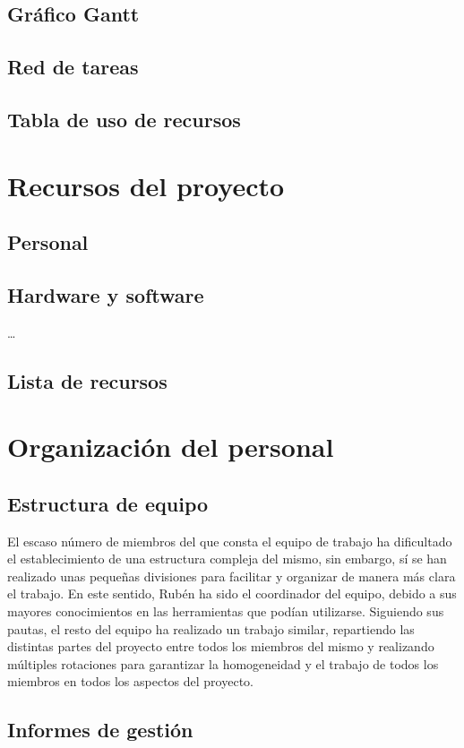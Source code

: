 \documentclass[11pt, a4paper, twoside]{report}
\begin{document}
		\subsection{Gráfico Gantt}
		\subsection{Red de tareas}
		\subsection{Tabla de uso de recursos}
	\section{Recursos del proyecto}
		\subsection{Personal}
		\subsection{Hardware y software}
			\ldots

		\subsection{Lista de recursos}
			

	\section{Organización del personal}
		\subsection{Estructura de equipo}	%
		El escaso número de miembros del que consta el equipo de trabajo ha dificultado el establecimiento de una estructura compleja del mismo, sin embargo, sí se han realizado unas pequeñas divisiones para facilitar y organizar de manera más clara el trabajo. En este sentido, Rubén ha sido el coordinador del equipo, debido a sus mayores conocimientos en las herramientas que podían utilizarse. Siguiendo sus pautas, el resto del equipo ha realizado un trabajo similar, repartiendo las distintas partes del proyecto entre todos los miembros del mismo y realizando múltiples rotaciones para garantizar la homogeneidad y el trabajo de todos los miembros en todos los aspectos del proyecto.
		\subsection{Informes de gestión}
\end{document}
